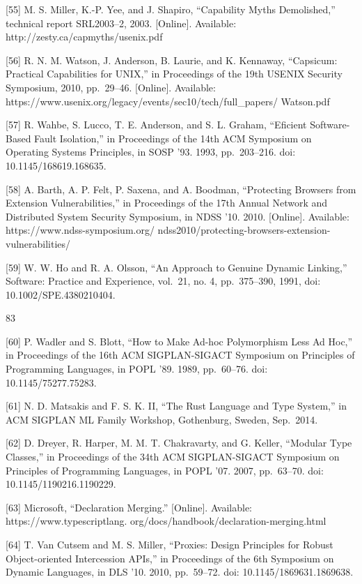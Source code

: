 \documentclass[
  10
]{article}
\begin{document}
{[}55{]} M. S. Miller, K.-P. Yee, and J. Shapiro, ``Capability Myths
Demolished,'' technical report SRL2003--2, 2003. {[}Online{]}.
Available: http://zesty.ca/capmyths/usenix.pdf

{[}56{]} R. N. M. Watson, J. Anderson, B. Laurie, and K. Kennaway,
``Capsicum: Practical Capabilities for UNIX,'' in Proceedings of the
19th USENIX Security Symposium, 2010, pp.~29--46. {[}Online{]}.
Available: https://www.usenix.org/legacy/events/sec10/tech/full\_papers/
Watson.pdf

{[}57{]} R. Wahbe, S. Lucco, T. E. Anderson, and S. L. Graham,
``Eficient Software-Based Fault Isolation,'' in Proceedings of the 14th
ACM Symposium on Operating Systems Principles, in SOSP '93. 1993,
pp.~203--216. doi: 10.1145/168619.168635.

{[}58{]} A. Barth, A. P. Felt, P. Saxena, and A. Boodman, ``Protecting
Browsers from Extension Vulnerabilities,'' in Proceedings of the 17th
Annual Network and Distributed System Security Symposium, in NDSS '10.
2010. {[}Online{]}. Available: https://www.ndss-symposium.org/
ndss2010/protecting-browsers-extension-vulnerabilities/

{[}59{]} W. W. Ho and R. A. Olsson, ``An Approach to Genuine Dynamic
Linking,'' Software: Practice and Experience, vol.~21, no. 4,
pp.~375--390, 1991, doi: 10.1002/SPE.4380210404.

83

{[}60{]} P. Wadler and S. Blott, ``How to Make Ad-hoc Polymorphism Less
Ad Hoc,'' in Proceedings of the 16th ACM SIGPLAN-SIGACT Symposium on
Principles of Programming Languages, in POPL '89. 1989, pp.~60--76. doi:
10.1145/75277.75283.

{[}61{]} N. D. Matsakis and F. S. K. II, ``The Rust Language and Type
System,'' in ACM SIGPLAN ML Family Workshop, Gothenburg, Sweden,
Sep.~2014.

{[}62{]} D. Dreyer, R. Harper, M. M. T. Chakravarty, and G. Keller,
``Modular Type Classes,'' in Proceedings of the 34th ACM SIGPLAN-SIGACT
Symposium on Principles of Programming Languages, in POPL '07. 2007,
pp.~63--70. doi: 10.1145/1190216.1190229.

{[}63{]} Microsoft, ``Declaration Merging.'' {[}Online{]}. Available:
https://www.typescriptlang. org/docs/handbook/declaration-merging.html

{[}64{]} T. Van Cutsem and M. S. Miller, ``Proxies: Design Principles
for Robust Object-oriented Intercession APIs,'' in Proceedings of the
6th Symposium on Dynamic Languages, in DLS '10. 2010, pp.~59--72. doi:
10.1145/1869631.1869638.
\end{document}
